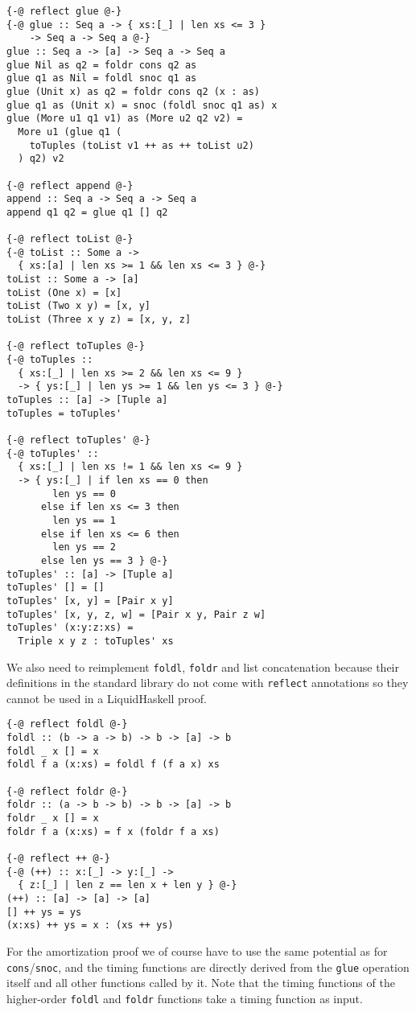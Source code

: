 \documentclass[sigplan,screen,review,anonymous]{acmart}
\begin{document}
\begin{lstlisting}
{-@ reflect glue @-}
{-@ glue :: Seq a -> { xs:[_] | len xs <= 3 }
    -> Seq a -> Seq a @-}
glue :: Seq a -> [a] -> Seq a -> Seq a
glue Nil as q2 = foldr cons q2 as
glue q1 as Nil = foldl snoc q1 as
glue (Unit x) as q2 = foldr cons q2 (x : as)
glue q1 as (Unit x) = snoc (foldl snoc q1 as) x
glue (More u1 q1 v1) as (More u2 q2 v2) =
  More u1 (glue q1 (
    toTuples (toList v1 ++ as ++ toList u2)
  ) q2) v2

{-@ reflect append @-}
append :: Seq a -> Seq a -> Seq a
append q1 q2 = glue q1 [] q2

{-@ reflect toList @-}
{-@ toList :: Some a ->
  { xs:[a] | len xs >= 1 && len xs <= 3 } @-}
toList :: Some a -> [a]
toList (One x) = [x]
toList (Two x y) = [x, y]
toList (Three x y z) = [x, y, z]

{-@ reflect toTuples @-}
{-@ toTuples ::
  { xs:[_] | len xs >= 2 && len xs <= 9 }
  -> { ys:[_] | len ys >= 1 && len ys <= 3 } @-}
toTuples :: [a] -> [Tuple a]
toTuples = toTuples'

{-@ reflect toTuples' @-}
{-@ toTuples' ::
  { xs:[_] | len xs != 1 && len xs <= 9 }
  -> { ys:[_] | if len xs == 0 then
        len ys == 0
      else if len xs <= 3 then
        len ys == 1
      else if len xs <= 6 then
        len ys == 2
      else len ys == 3 } @-}
toTuples' :: [a] -> [Tuple a]
toTuples' [] = []
toTuples' [x, y] = [Pair x y]
toTuples' [x, y, z, w] = [Pair x y, Pair z w]
toTuples' (x:y:z:xs) =
  Triple x y z : toTuples' xs
\end{lstlisting}

We also need to reimplement \texttt{foldl}, \texttt{foldr} and list concatenation because their definitions in the standard library do not come with \texttt{reflect} annotations so they cannot be used in a LiquidHaskell proof.

\begin{lstlisting}
{-@ reflect foldl @-}
foldl :: (b -> a -> b) -> b -> [a] -> b 
foldl _ x [] = x
foldl f a (x:xs) = foldl f (f a x) xs

{-@ reflect foldr @-}
foldr :: (a -> b -> b) -> b -> [a] -> b
foldr _ x [] = x
foldr f a (x:xs) = f x (foldr f a xs)

{-@ reflect ++ @-}
{-@ (++) :: x:[_] -> y:[_] ->
  { z:[_] | len z == len x + len y } @-}
(++) :: [a] -> [a] -> [a]
[] ++ ys = ys
(x:xs) ++ ys = x : (xs ++ ys)
\end{lstlisting}

For the amortization proof we of course have to use the same potential as for \texttt{cons}/\texttt{snoc}, and the timing functions are directly derived from the \texttt{glue} operation itself and all other functions called by it. Note that the timing functions of the higher-order \texttt{foldl} and \texttt{foldr} functions take a timing function as input.
\end{document}
